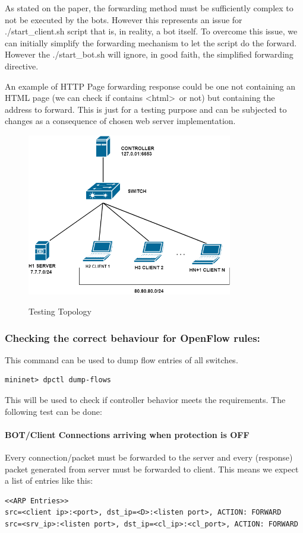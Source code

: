 As stated on the paper, the forwarding method must be sufficiently complex to not be executed by the bots. However this represents an issue for ./start\_client.sh script that is, in reality, a bot itself. To overcome this issue, we can initially simplify the forwarding mechanism to let the script do the forward. However the ./start\_bot.sh will ignore, in good faith, the simplified forwarding directive.

An example of HTTP Page forwarding response could be one not containing an HTML page (we can check if contains \textless html\textgreater\ or not) but containing the address to forward. This is just for a testing purpose and can be subjected to changes as a consequence of chosen web server implementation.

\begin{figure}[H]
\begin{center}
\includegraphics[width=0.8\textwidth]{images/TestingTopology.png}
\label{fig:testing}
\caption{Testing Topology}
\end{center}
\end{figure}

\subsubsection{Checking the correct behaviour for OpenFlow rules:}
This command can be used to dump flow entries of all switches.
\begin{lstlisting}
mininet> dpctl dump-flows
\end{lstlisting}

This will be used to check if controller behavior meets the requirements. The following test can be done:

\paragraph{BOT/Client Connections arriving when protection is OFF}
Every connection/packet must be forwarded to the server and every (response) packet generated from server must be forwarded to client. This means we expect a list of entries like this:
\begin{lstlisting}
<<ARP Entries>>
src=<client ip>:<port>, dst_ip=<D>:<listen port>, ACTION: FORWARD
src=<srv_ip>:<listen port>, dst_ip=<cl_ip>:<cl_port>, ACTION: FORWARD
\end{lstlisting}

